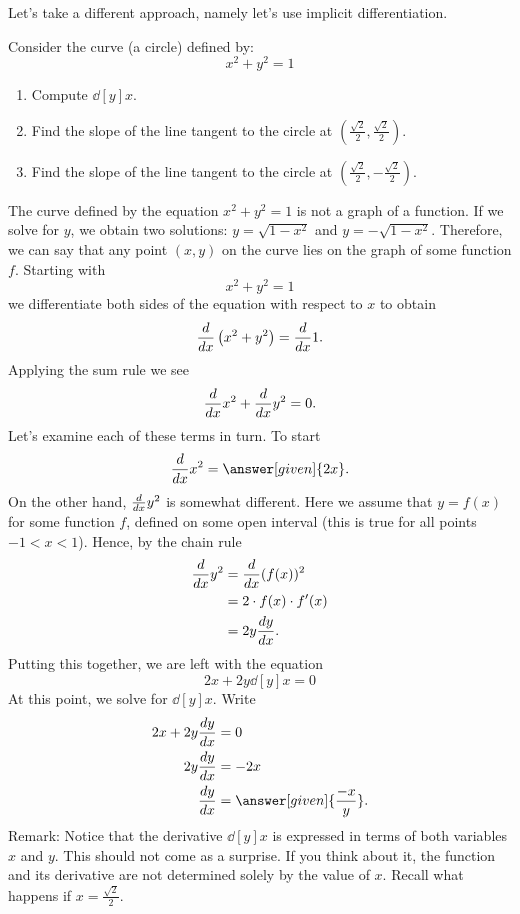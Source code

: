 \documentclass{ximera}
\begin{document}
Let's take a different approach, namely let's use implicit differentiation.
\begin{example}
Consider the curve (a circle) defined by:
\[
x^2 + y^2 = 1
\]
\begin{enumerate}
\item Compute $\dd[y]{x}$.
\item Find the slope of the line tangent to the circle at $\left(\frac{\sqrt{2}}{2},\frac{\sqrt{2}}{2}\right)$.
\item Find the slope of the line tangent to the circle at $\left(\frac{\sqrt{2}}{2},-\frac{\sqrt{2}}{2}\right)$.
\end{enumerate}
\begin{explanation}

The curve defined by the equation  $x^2 + y^2 = 1$ is not a graph of a function. If we solve for $y$, we obtain two solutions:
$y=\sqrt{1-x^2}$ and $y=-\sqrt{1-x^2}$. Therefore, we can say that  any point $(x,y)$ on the curve lies on the graph of some function $f$.
  Starting with
\[
x^2 + y^2 = 1
\]
we differentiate both sides of the
equation with respect to $x$ to obtain
\[
\ddx \left(x^2+y^2\right) = \ddx 1.
\]
Applying the sum rule we see
\[
\ddx x^2+\ddx y^2 = 0.
\]
Let's examine each of these terms in turn. To start
\[
\ddx x^2 = \answer[given]{2x}.
\]
On the other hand, $\ddx y^2$ is somewhat different. Here we assume that $y = f(x)$ for some function $f$, defined on some open interval (this is true for all points $-1<x<1$). Hence, by the chain rule
\begin{align*}
\ddx y^2 &= \ddx (f(x))^2 \\
&= 2\cdot f(x) \cdot f'(x) \\
&= 2y\dd[y]{x}.
\end{align*}
Putting this together, we are left with the equation
\[
2x + 2y\dd[y]{x} =0
\]
At this point, we solve for $\dd[y]{x}$. Write
\begin{align*}
2x + 2y\dd[y]{x} &= 0\\
2y \dd[y]{x} &= -2x\\
\dd[y]{x} &= \answer[given]{\frac{-x}{y}}.
\end{align*}
Remark: Notice that the derivative $\dd[y]{x} $ is expressed in terms of both variables $x$ and $y$. This should not come as a surprise. If you think about it, the function and  its derivative are not determined solely by the value of $x$. Recall what happens if $x=\frac{\sqrt{2}}{2}$.



\end{explanation}
\end{example}
\end{document}
